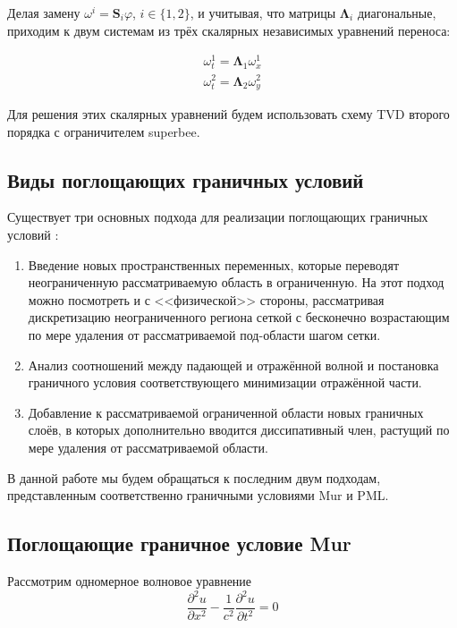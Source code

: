 Делая замену $\omega^i =  \pmb{S}_i \varphi$, $i\in\{1,2\}$, и учитывая, что матрицы $\pmb{\Lambda}_i$ диагональные, приходим к двум системам из трёх скалярных независимых уравнений переноса:

\begin{equation}
\begin{gathered} 
	\omega^1_t = \pmb{\Lambda}_1 \omega^1_x\\
	\omega^2_t = \pmb{\Lambda}_2 \omega^2_y
\end{gathered}
\end{equation}

Для решения этих скалярных уравнений будем использовать схему TVD второго порядка с ограничителем superbee. \cite{superbee_scheme}

\subsection{Виды поглощающих граничных условий}

Существует три основных подхода для реализации поглощающих граничных условий \cite{Trefethen1996FiniteDA} \cite{arch_comp_sim}:
\begin{enumerate}
    \item  Введение новых пространственных переменных, которые переводят неограниченную рассматриваемую область в ограниченную. На этот подход можно посмотреть и с <<физической>> стороны, рассматривая дискретизацию неограниченного региона сеткой с бесконечно возрастающим по мере удаления от рассматриваемой под-области шагом сетки.
    \item Анализ соотношений между падающей и отражённой волной и постановка граничного условия соответствующего минимизации отражённой части.
    \item Добавление к рассматриваемой ограниченной области новых граничных слоёв, в которых дополнительно вводится диссипативный член, растущий по мере удаления от рассматриваемой области.
\end{enumerate}

В данной работе мы будем обращаться к последним двум подходам, представленным соответственно граничными условиями Mur и PML.

\subsection{Поглощающие граничное условие Mur}

Рассмотрим одномерное волновое уравнение
\begin{equation}
    \dfrac{\partial^2 u}{\partial x^2} - \dfrac{1}{c^2}\dfrac{\partial^2 u}{\partial t^2} = 0
    \label{eq:1d_wave_eq}
\end{equation}

